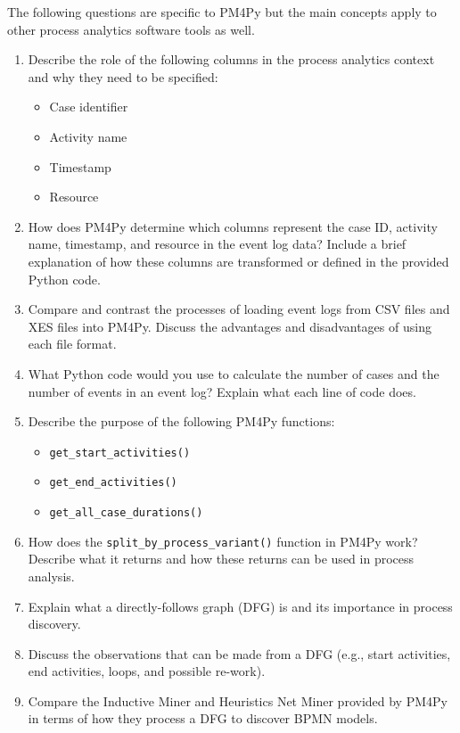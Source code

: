 \begin{withcode}
The following questions are specific to PM4Py but the main concepts apply to other process analytics software tools as well.

\begin{enumerate}

    \item Describe the role of the following columns in the process analytics context and why they need to be specified:
    \begin{itemize}
        \item Case identifier
        \item Activity name
        \item Timestamp
        \item Resource
    \end{itemize}
    \item How does PM4Py determine which columns represent the case ID, activity name, timestamp, and resource in the event log data? Include a brief explanation of how these columns are transformed or defined in the provided Python code.
    \item Compare and contrast the processes of loading event logs from CSV files and XES files into PM4Py. Discuss the advantages and disadvantages of using each file format.
    \item What Python code would you use to calculate the number of cases and the number of events in an event log? Explain what each line of code does.
    \item Describe the purpose of the following PM4Py functions:
    \begin{itemize}
        \item \texttt{get\_start\_activities()}
        \item \texttt{get\_end\_activities()}
        \item \texttt{get\_all\_case\_durations()}
    \end{itemize}
    \item How does the \texttt{split\_by\_process\_variant()} function in PM4Py work? Describe what it returns and how these returns can be used in process analysis.
    \item Explain what a directly-follows graph (DFG) is and its importance in process discovery.
    \item Discuss the observations that can be made from a DFG (e.g., start activities, end activities, loops, and possible re-work).
    \item Compare the Inductive Miner and Heuristics Net Miner provided by PM4Py in terms of how they process a DFG to discover BPMN models.

\end{enumerate}
\end{withcode}
